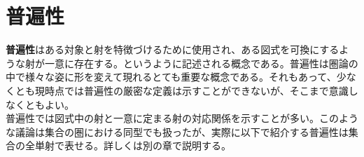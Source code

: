 \section{普遍性}\label{chap-4-universal-property}
	\textbf{普遍性}はある対象と射を特徴づけるために使用され、ある図式を可換にするような射が一意に存在する。というように記述される概念である。普遍性は圏論の中で様々な姿に形を変えて現れるとても重要な概念である。それもあって、少なくとも現時点では普遍性の厳密な定義は示すことができないが、そこまで意識しなくともよい。\\
  普遍性では図式中の射と一意に定まる射の対応関係を示すことが多い。このような議論は集合の圏における同型でも扱ったが、実際に以下で紹介する普遍性は集合の全単射で表せる。詳しくは別の章で説明する。\\
	
	